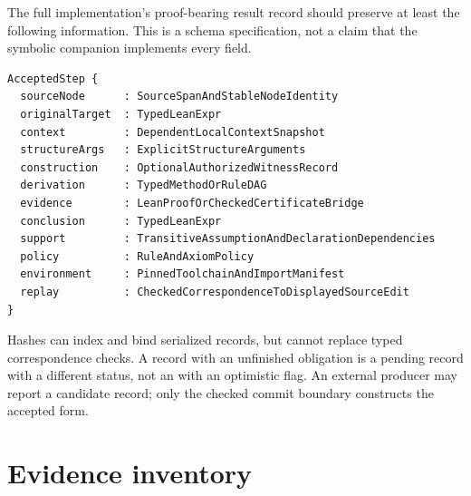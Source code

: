 \documentclass[11pt,a4paper]{article}
\newcommand{\code}[1]{\texttt{\detokenize{#1}}}
\theoremstyle{definition}
\theoremstyle{remark}
\begin{document}
The full implementation's proof-bearing result record should preserve at least
the following information. This is a schema specification, not a claim that
the symbolic companion implements every field.
\begin{lstlisting}
AcceptedStep {
  sourceNode      : SourceSpanAndStableNodeIdentity
  originalTarget  : TypedLeanExpr
  context         : DependentLocalContextSnapshot
  structureArgs   : ExplicitStructureArguments
  construction    : OptionalAuthorizedWitnessRecord
  derivation      : TypedMethodOrRuleDAG
  evidence        : LeanProofOrCheckedCertificateBridge
  conclusion      : TypedLeanExpr
  support         : TransitiveAssumptionAndDeclarationDependencies
  policy          : RuleAndAxiomPolicy
  environment     : PinnedToolchainAndImportManifest
  replay          : CheckedCorrespondenceToDisplayedSourceEdit
}
\end{lstlisting}
Hashes can index and bind serialized records, but cannot replace typed
correspondence checks. A record with an unfinished obligation is a pending
record with a different status, not an \code{AcceptedStep} with an optimistic
flag. An external producer may report a candidate record; only the checked
commit boundary constructs the accepted form.

\section{Evidence inventory}\label{app:evidence}
\end{document}
